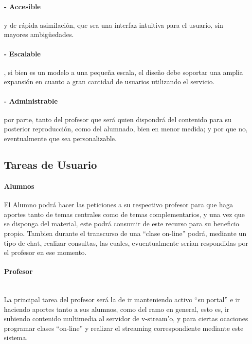 \documentclass[12pt]{article}
\begin{document}
\paragraph{- Accesible} y de rápida asimilación, que sea una interfaz intuitiva para el usuario, sin mayores
ambigüedades.\\

\paragraph{- Escalable}, si bien es un modelo a una peque\~na escala, el dise\~no debe soportar una amplia 
expansión en cuanto a gran cantidad de usuarios utilizando el servicio.\\

\paragraph{- Administrable} por parte, tanto del profesor que será quien dispondrá del contenido para su posterior
reproducción, como del alumnado, bien en menor medida; y por que no, eventualmente que sea personalizable.\\

\newpage
\subsection{Tareas de Usuario}
\paragraph{Alumnos\\}

El Alumno podrá hacer las peticiones a su respectivo profesor para que haga aportes tanto de temas 
centrales como de temas complementarios, y una vez que se disponga del material, este podrá consumir
de este recurso para su beneficio propio. Tambien durante el transcurso de una ``clase on-line'' podrá,
mediante un tipo de chat, realizar consultas, las cuales, evuentualmente serían respondidas por el profesor en ese momento.\\

\paragraph{Profesor\\\\}

La principal tarea del profesor será la de ir manteniendo activo ``su portal'' e ir haciendo aportes
tanto a sus alumnos, como del ramo en general, esto es, ir subiendo contenido multimedia al servidor de 
v-stream'o, y para ciertas ocaciones programar clases ``on-line'' y realizar el streaming correspondiente
mediante este sistema.\\
\end{document}
